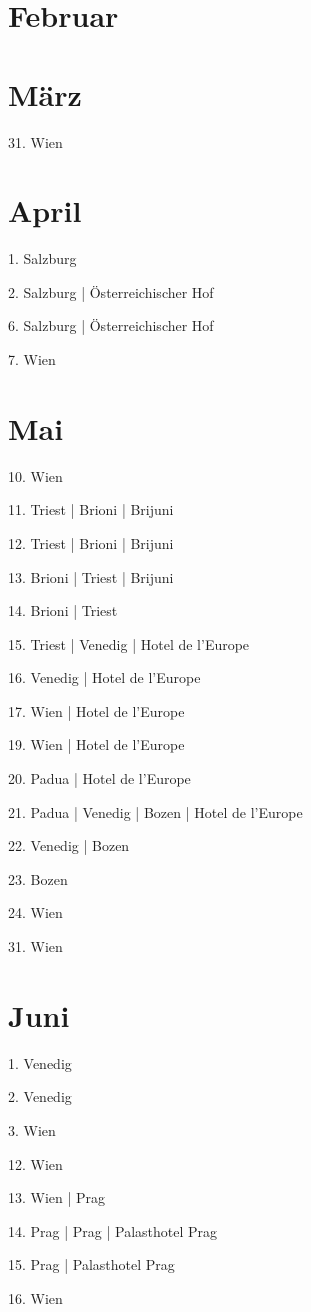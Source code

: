 \documentclass[twoside=false,titlepage=false,open=any, parskip=never, fontsize=10pt, headings=small, chapterprefix=false, appendixprefix=false, DIV=15]{scrbook}
\begin{document}
\begin{multicols}{3}
            \section*{Februar}
            \section*{März}
            31. Wien\par
            \section*{April}
            1. Salzburg\par
            2. Salzburg | Österreichischer Hof\par
            6. Salzburg | Österreichischer Hof\par
            7. Wien\par
            \section*{Mai}
            10. Wien\par
            11. Triest | Brioni | Brijuni\par
            12. Triest | Brioni | Brijuni\par
            13. Brioni | Triest | Brijuni\par
            14. Brioni | Triest\par
            15. Triest | Venedig | Hotel de l’Europe\par
            16. Venedig | Hotel de l’Europe\par
            17. Wien | Hotel de l’Europe\par
            19. Wien | Hotel de l’Europe\par
            20. Padua | Hotel de l’Europe\par
            21. Padua | Venedig | Bozen | Hotel de l’Europe\par
            22. Venedig | Bozen\par
            23. Bozen\par
            24. Wien\par
            31. Wien\par
            \section*{Juni}
            1. Venedig\par
            2. Venedig\par
            3. Wien\par
            12. Wien\par
            13. Wien | Prag\par
            14. Prag | Prag | Palasthotel Prag\par
            15. Prag | Palasthotel Prag\par
            16. Wien\par

\end{multicols}
\end{document}
